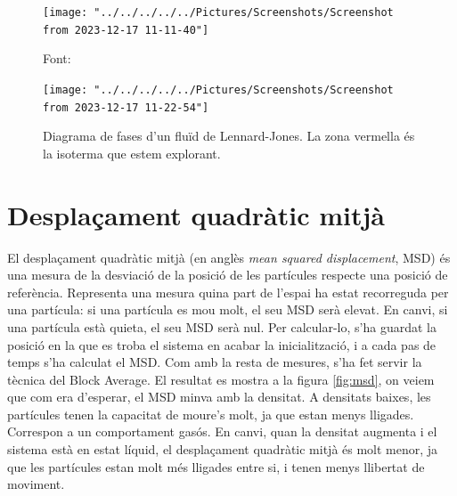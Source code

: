 \documentclass[a4paper,10pt]{article}
\begin{document}
	\begin{figure}
	\centering
	\texttt{[image: "../../../../../Pictures/Screenshots/Screenshot from 2023-12-17 11-11-40"]}
	\caption{Font: \cite{Gregory}}
	\label{fig:screenshot-from-2023-12-17-11-11-40}
	\end{figure}

	\begin{figure}
		\centering
		\texttt{[image: "../../../../../Pictures/Screenshots/Screenshot from 2023-12-17 11-22-54"]}
		\caption{Diagrama de fases d'un fluïd de Lennard-Jones. La zona vermella és la isoterma que estem explorant.}
		\label{fig:screenshot-from-2023-12-17-11-22-54}
	\end{figure}










\section{Desplaçament quadràtic mitjà}

El desplaçament quadràtic mitjà (en anglès \textit{mean squared displacement}, MSD) és una mesura de la desviació de la posició de les partícules respecte una posició de referència. Representa una mesura quina part de l'espai ha estat recorreguda per una partícula: si una partícula es mou molt, el seu MSD serà elevat. En canvi, si una partícula està quieta, el seu MSD serà nul. Per calcular-lo, s'ha guardat la posició en la que es troba el sistema en acabar la inicialització, i a cada pas de temps s'ha calculat el MSD. Com amb la resta de mesures, s'ha fet servir la tècnica del Block Average. El resultat es mostra a la figura \ref{fig:msd}, on veiem que com era d'esperar, el MSD minva amb la densitat. A densitats baixes, les partícules tenen la capacitat de moure's molt, ja que estan menys lligades. Correspon a un comportament gasós. En canvi, quan la densitat augmenta i el sistema està en estat líquid, el desplaçament quadràtic mitjà és molt menor, ja que les partícules estan molt més lligades entre si, i tenen menys llibertat de moviment.
\end{document}
